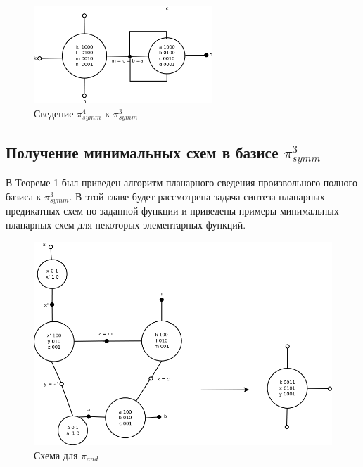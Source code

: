 \documentclass[12pt]{article}
\begin{document}
\begin{figure}[htb]
 \centering
\includegraphics[width=0.6\textwidth]{4to3.png}
\caption{Сведение $\pi_{symm}^4$ к $\pi_{symm}^3$ }
\label{fig:4to3}
\end{figure}



\clearpage
\subsection{Получение минимальных схем в базисе $\pi_{symm}^3$}
В Теореме 1 был приведен алгоритм планарного сведения произвольного полного базиса к $\pi_{symm}^3$. 
В этой главе будет рассмотрена задача синтеза планарных предикатных схем по заданной функции и 
приведены примеры минимальных планарных схем для некоторых элементарных функций.


\begin{figure}[htb]
\centering
\includegraphics[width=1.0\textwidth]{min_and.png}
\caption{Схема для $\pi_{and}$}
\label{fig:and}
\end{figure}
\end{document}
